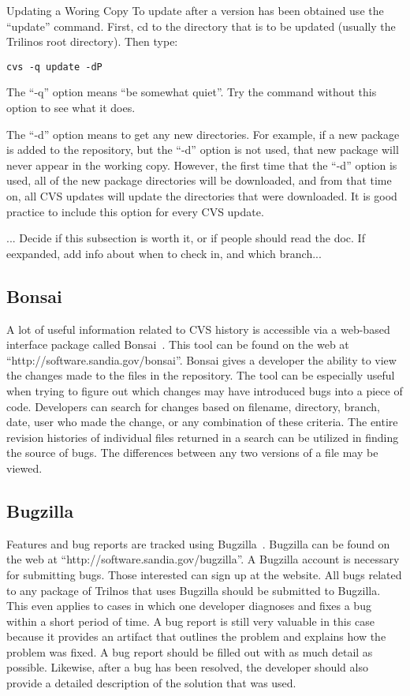 \documentclass[12pt,relax]{SANDreport}
\begin{document}
Updating a Woring Copy
To update after a version has been obtained use the ``update'' command.  
First, cd to the directory that is to be updated (usually the Trilinos root 
directory).  Then type:

\begin{verbatim}
cvs -q update -dP
\end{verbatim}

The ``-q'' option means ``be somewhat quiet''.  Try the command without this
option to see what it does.  

The ``-d'' option means to get any new directories.  For example, if a new 
package is added to the repository, but the ``-d'' option is not used, that 
new package will never appear in the working copy.  However, the first time 
that the ``-d'' option is used, all of the new package directories will be 
downloaded, and from that time on, all CVS updates will update the 
directories that were downloaded.  It is good practice to include this 
option for every CVS update.

... Decide if this subsection is worth it, or if people should read the doc.  If eexpanded, add info about when to check in, and which branch...

\subsection{Bonsai}
A lot of useful information related to CVS history is accessible via a
web-based interface package called Bonsai~\cite{Bonsai}.  This tool can be 
found on the web at ``http://software.sandia.gov/bonsai''.  Bonsai gives a 
developer the ability to view the changes made to the files in the 
repository.  The tool can be especially useful when trying to figure out which 
changes may have introduced bugs into a piece of code.  Developers can search 
for changes based on filename, directory, branch, date, user who made the 
change, or any combination of these criteria.  The entire revision histories of
individual files returned in a search can be utilized in finding the source of 
bugs.  The differences between any two versions of a file may be viewed.  

\subsection{Bugzilla}

Features and bug reports are tracked using Bugzilla~\cite{Bugzilla}.  Bugzilla 
can be found on the web at ``http://software.sandia.gov/bugzilla''.  A 
Bugzilla account is necessary for submitting bugs.  Those interested can sign 
up at the website.  All bugs related to any package of Trilnos that uses 
Bugzilla should be submitted to Bugzilla.  This even applies to cases in which 
one developer diagnoses and fixes a bug within a short period of time.  A bug 
report is still very valuable in this case because it provides an artifact 
that outlines the problem and explains how the problem was fixed.  A bug 
report should be filled out with as much detail as possible.  Likewise, after 
a bug has been resolved, the developer should also provide a detailed 
description of the solution that was used.
\end{document}
